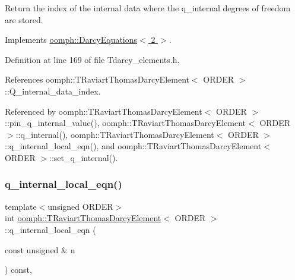 Return the index of the internal data where the q\+\_\+internal degrees of freedom are stored. 



Implements \hyperlink{classoomph_1_1DarcyEquations_a84f8df62f86028a3519df586a18a3d20}{oomph\+::\+Darcy\+Equations$<$ 2 $>$}.



Definition at line 169 of file Tdarcy\+\_\+elements.\+h.



References oomph\+::\+T\+Raviart\+Thomas\+Darcy\+Element$<$ O\+R\+D\+E\+R $>$\+::\+Q\+\_\+internal\+\_\+data\+\_\+index.



Referenced by oomph\+::\+T\+Raviart\+Thomas\+Darcy\+Element$<$ O\+R\+D\+E\+R $>$\+::pin\+\_\+q\+\_\+internal\+\_\+value(), oomph\+::\+T\+Raviart\+Thomas\+Darcy\+Element$<$ O\+R\+D\+E\+R $>$\+::q\+\_\+internal(), oomph\+::\+T\+Raviart\+Thomas\+Darcy\+Element$<$ O\+R\+D\+E\+R $>$\+::q\+\_\+internal\+\_\+local\+\_\+eqn(), and oomph\+::\+T\+Raviart\+Thomas\+Darcy\+Element$<$ O\+R\+D\+E\+R $>$\+::set\+\_\+q\+\_\+internal().

\mbox{\label{classoomph_1_1TRaviartThomasDarcyElement_a9c2b450d0dc3ce6a683409f2e82b8589}} 
\subsubsection{\texorpdfstring{q\+\_\+internal\+\_\+local\+\_\+eqn()}{q\_internal\_local\_eqn()}}
{\footnotesize\ttfamily template$<$unsigned O\+R\+D\+ER$>$ \\
int \hyperlink{classoomph_1_1TRaviartThomasDarcyElement}{oomph\+::\+T\+Raviart\+Thomas\+Darcy\+Element}$<$ O\+R\+D\+ER $>$\+::q\+\_\+internal\+\_\+local\+\_\+eqn (\begin{DoxyParamCaption}\item[{const unsigned \&}]{n }\end{DoxyParamCaption}) const\hspace{0.3cm}{\ttfamily [inline]}, {\ttfamily [virtual]}}



